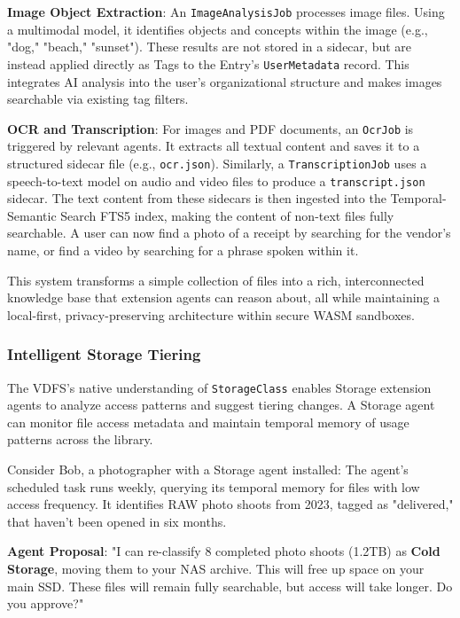 \documentclass[sigconf]{acmart}
\newcommand{\plannedSection}[1]{#1}
\begin{document}
\textbf{Image Object Extraction}: An \texttt{ImageAnalysisJob} processes image files. Using a multimodal model, it identifies objects and concepts within the image (e.g., "dog," "beach," "sunset"). These results are not stored in a sidecar, but are instead applied directly as Tags to the Entry's \texttt{UserMetadata} record. This integrates AI analysis into the user's organizational structure and makes images searchable via existing tag filters.

\textbf{OCR and Transcription}: For images and PDF documents, an \texttt{OcrJob} is triggered by relevant agents. It extracts all textual content and saves it to a structured sidecar file (e.g., \texttt{ocr.json}). Similarly, a \texttt{TranscriptionJob} uses a speech-to-text model on audio and video files to produce a \texttt{transcript.json} sidecar. The text content from these sidecars is then ingested into the Temporal-Semantic Search FTS5 index, making the content of non-text files fully searchable. A user can now find a photo of a receipt by searching for the vendor's name, or find a video by searching for a phrase spoken within it.

This system transforms a simple collection of files into a rich, interconnected knowledge base that extension agents can reason about, all while maintaining a local-first, privacy-preserving architecture within secure WASM sandboxes.

\subsubsection{\plannedSection{Intelligent Storage Tiering}}

The VDFS's native understanding of \texttt{StorageClass} enables Storage extension agents to analyze access patterns and suggest tiering changes. A Storage agent can monitor file access metadata and maintain temporal memory of usage patterns across the library.

Consider Bob, a photographer with a Storage agent installed: The agent's scheduled task runs weekly, querying its temporal memory for files with low access frequency. It identifies RAW photo shoots from 2023, tagged as "delivered," that haven't been opened in six months.

\textbf{Agent Proposal}: "I can re-classify 8 completed photo shoots (1.2TB) as \textbf{Cold Storage}, moving them to your NAS archive. This will free up space on your main SSD. These files will remain fully searchable, but access will take longer. Do you approve?"
\end{document}

